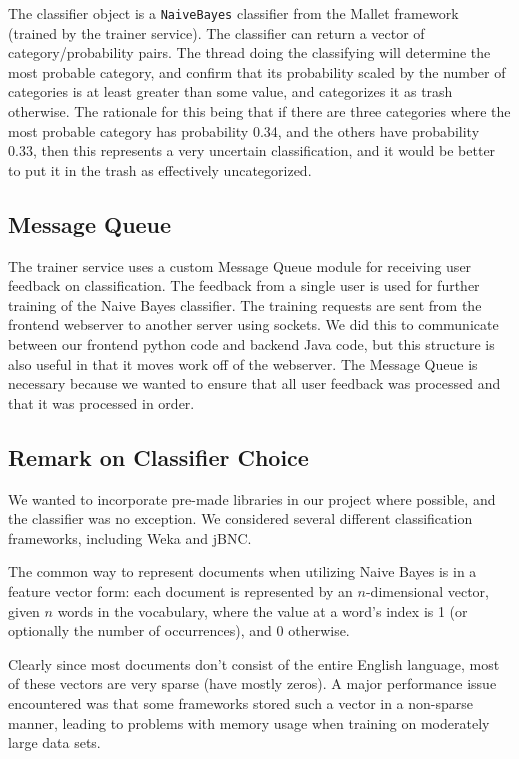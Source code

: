 \documentclass[letterpaper]{article}
\begin{document}
The classifier object is a \texttt{NaiveBayes} classifier from the Mallet framework (trained by the trainer service). The classifier can return a vector of category/probability pairs. The thread doing the classifying will determine the most probable category, and confirm that its probability scaled by the number of categories is at least greater than some value, and categorizes it as trash otherwise. The rationale for this being that if there are three categories where the most probable category has probability 0.34, and the others have probability 0.33, then this represents a very uncertain classification, and it would be better to put it in the trash as effectively uncategorized.

\subsection{Message Queue}
\label{MessageQueueSection}
The trainer service uses a custom Message Queue module for receiving user feedback on classification. The feedback from a single user is used for further training of the Naive Bayes classifier. The training requests are sent from the frontend webserver to another server using sockets. We did this to communicate between our frontend python code and backend Java code, but this structure is also useful in that it moves work off of the webserver. The Message Queue is necessary because we wanted to ensure that all user feedback was processed and that it was processed in order.

\subsection{Remark on Classifier Choice}
We wanted to incorporate pre-made libraries in our project where possible, and the classifier was no exception. We considered several different classification frameworks, including Weka and jBNC.

The common way to represent documents when utilizing Naive Bayes is in a feature vector form: each document is represented by an $n$-dimensional vector, given $n$ words in the vocabulary, where the value at a word's index is 1 (or optionally the number of occurrences), and 0 otherwise.

Clearly since most documents don't consist of the entire English language, most of these vectors are very sparse (have mostly zeros).
A major performance issue encountered was that some frameworks stored such a vector in a non-sparse manner, leading to problems with memory usage when training on moderately large data sets.
\end{document}
